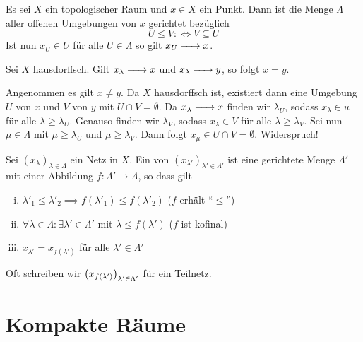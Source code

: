 Es sei $X$ ein topologischer Raum und $x \in X$ ein Punkt.
Dann ist die Menge $\Lambda$ aller offenen Umgebungen von $x$ gerichtet bezüglich
\[
	U \le V :\Longleftrightarrow V \subseteq U
\]
Ist nun $x_U \in U$ für alle $U \in \Lambda $ so gilt $x_U \grenzw{} x$.

\begin{lemma}[{name=[Eindeutigkeit von Grenzwerten]}]
	Sei $X$ hausdorffsch. Gilt $x_\lambda \grenzw{} x$ und $x_\lambda \grenzw{} y$, so folgt $x=y$.
\end{lemma}
\begin{beweis}
	Angenommen es gilt $x \neq y$.
	Da $X$ hausdorffsch ist, existiert dann eine Umgebung $U$ von $x$ und $V$ von $y$ mit $U \cap V = \emptyset$.
	Da $x_\lambda \grenzw{} x$ finden wir $\lambda_U$, sodass $x_\lambda \in u$ für alle $\lambda \ge \lambda_U$.
	Genauso finden wir $\lambda_V$, sodass $x_\lambda \in V$ für alle $\lambda \ge \lambda_V$.
	Sei nun $\mu \in \Lambda$ mit $\mu \ge \lambda_U$ und $\mu \ge \lambda_V$.
	Dann folgt $x_\mu \in U\cap V = \emptyset$. Widerspruch!
\end{beweis}

\begin{definition}[{name=[Teilnetz]}]
	Sei $(x_\lambda)_{\lambda  \in \Lambda}$ ein Netz in $X$.
	Ein  von $(x_{\lambda'} )_{\lambda'  \in \Lambda'}$ ist eine gerichtete Menge $\Lambda'$ mit einer
	Abbildung $f \colon \Lambda' \to \Lambda$, so dass gilt
	\begin{enumerate}[i)]
		\item $\lambda'_1 \le \lambda'_2 \implies f(\lambda'_1) \le f(\lambda'_2)$ \hfill ($f$ erhält \enquote{$\le$})
		\item $\forall \lambda \in \Lambda : \exists \lambda' \in \Lambda'$ mit $\lambda  \le f(\lambda' )$ \hfill ($f$ ist kofinal)
		\item $x_{\lambda'} = x_{f(\lambda')}$ für alle $\lambda ' \in \Lambda'$
	\end{enumerate}
	Oft schreiben wir $\enbrace*{x_{f(\lambda')}}_{\lambda' \in \Lambda'}$ für ein Teilnetz.
\end{definition}

\newpage

\section{Kompakte Räume} %
\label{sec:4}

